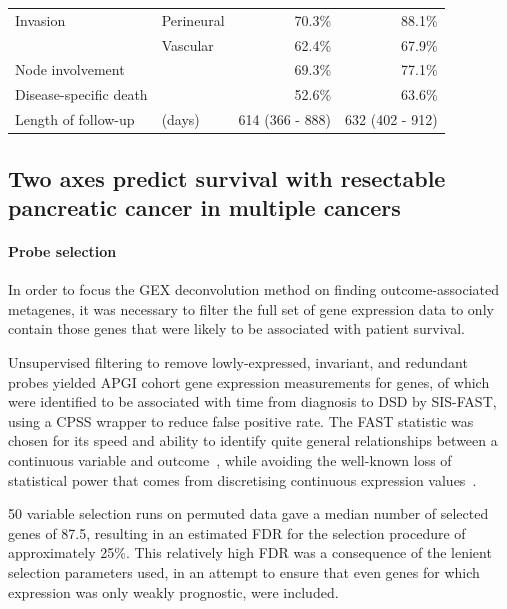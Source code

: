 \documentclass[dissertation.tex]{subfiles}
\begin{document}
\begin{table}[!htbp]
{\begin{tabular}{@{}llrr@{}}
Invasion                   & Perineural               & 70.3\%                   & 88.1\%                                                 \\
                           & Vascular                 & 62.4\%                   & 67.9\%                                                 \\
Node involvement           &                          & 69.3\%                   & 77.1\%                                                 \\
Disease-specific death     &                          & 52.6\%                   & 63.6\%                                                 \\
Length of follow-up & (days)                         & 614 (366 - 888)          & 632 (402 - 912)                                       
\end{tabular}
}
\end{table}

\subsection{Two axes predict survival with resectable pancreatic cancer in multiple cancers}
\paragraph{Probe selection}
In order to focus the \gls{GEX} deconvolution method on finding outcome-associated metagenes, it was necessary to filter the full set of gene expression data to only contain those genes that were likely to be associated with patient survival.

Unsupervised filtering to remove lowly-expressed, invariant, and redundant probes yielded \gls{APGI} cohort gene expression measurements for  genes, of which  were identified to be associated with time from diagnosis to \gls{DSD} by \gls{SIS}-\gls{FAST}, using a \gls{CPSS} wrapper to reduce false positive rate.  The \gls{FAST} statistic was chosen for its speed and ability to identify quite general relationships between a continuous variable and outcome~\cite{Gorst-Rasmussen2013}, while avoiding the well-known loss of statistical power that comes from discretising continuous expression values~\cite{Royston2006}.

50 variable selection runs on permuted data gave a median number of selected genes of 87.5, resulting in an estimated \gls{FDR} for the selection procedure of approximately 25\%.  This relatively high \gls{FDR} was a consequence of the lenient selection parameters used, in an attempt to ensure that even genes for which expression was only weakly prognostic, were included.
\end{document}
